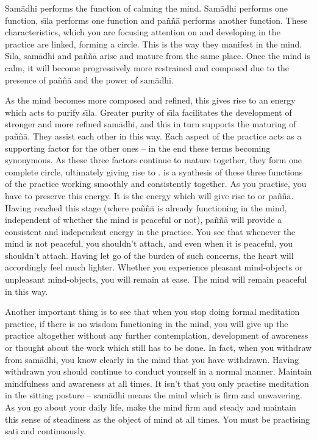 Sam\=adhi performs the function of calming the mind. Sam\=adhi performs one function, s\={\i}la performs one function and pa\~n\~n\=a performs another function. These characteristics, which you are focusing attention on and developing in the practice are linked, forming a circle. This is the way they manifest in the mind. S\={\i}la, sam\=adhi and pa\~n\~n\=a arise and mature from the same place. Once the mind is calm, it will become progressively more restrained and composed due to the presence of pa\~n\~n\=a and the power of sam\=adhi.

As the mind becomes more composed and refined, this gives rise to an energy which acts to purify s\={\i}la. Greater purity of s\={\i}la facilitates the development of stronger and more refined sam\=adhi, and this in turn supports the maturing of pa\~n\~n\=a. They assist each other in this way. Each aspect of the practice acts as a supporting factor for the other ones -- in the end these terms becoming synonymous. As these three factors continue to mature together, they form one complete circle, ultimately giving rise to .  is a synthesis of these three functions of the practice working smoothly and consistently together. As you practise, you have to preserve this energy. It is the energy which will give rise to  or pa\~n\~n\=a. Having reached this stage (where pa\~n\~n\=a is already functioning in the mind, independent of whether the mind is peaceful or not), pa\~n\~n\=a will provide a consistent and independent energy in the practice. You see that whenever the mind is not peaceful, you shouldn't attach, and even when it is peaceful, you shouldn't attach. Having let go of the burden of such concerns, the heart will accordingly feel much lighter. Whether you experience pleasant mind-objects or unpleasant mind-objects, you will remain at ease. The mind will remain peaceful in this way.

Another important thing is to see that when you stop doing formal meditation practice, if there is no wisdom functioning in the mind, you will give up the practice altogether without any further contemplation, development of awareness or thought about the work which still has to be done. In fact, when you withdraw from sam\=adhi, you know clearly in the mind that you have withdrawn. Having withdrawn you should continue to conduct yourself in a normal manner. Maintain mindfulness and awareness at all times. It isn't that you only practise meditation in the sitting posture -- sam\=adhi means the mind which is firm and unwavering. As you go about your daily life, make the mind firm and steady and maintain this sense of steadiness as the object of mind at all times. You must be practising sati and  continuously.

